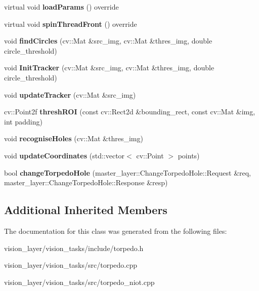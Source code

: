 \begin{DoxyCompactItemize}
\item 
\mbox{\label{classTorpedo_aa7080c7f22c85dc381eb83b547b619e5}} 
virtual void {\bfseries load\+Params} () override
\item 
\mbox{\label{classTorpedo_a0b9be299d42d31a8eda90f0322fc1325}} 
virtual void {\bfseries spin\+Thread\+Front} () override
\item 
\mbox{\label{classTorpedo_a034e99a1d14fd16b174f15d12c579075}} 
void {\bfseries find\+Circles} (cv\+::\+Mat \&src\+\_\+img, cv\+::\+Mat \&thres\+\_\+img, double circle\+\_\+threshold)
\item 
\mbox{\label{classTorpedo_a2010f06ca24b6ebfcd10b05346a889da}} 
void {\bfseries Init\+Tracker} (cv\+::\+Mat \&src\+\_\+img, cv\+::\+Mat \&thres\+\_\+img, double circle\+\_\+threshold)
\item 
\mbox{\label{classTorpedo_a7f0bdf8a23ae27e30177ce27fbd1488d}} 
void {\bfseries update\+Tracker} (cv\+::\+Mat \&src\+\_\+img)
\item 
\mbox{\label{classTorpedo_ad5e92180089075ecb42f3cea1bd79e4c}} 
cv\+::\+Point2f {\bfseries thresh\+R\+OI} (const cv\+::\+Rect2d \&bounding\+\_\+rect, const cv\+::\+Mat \&img, int padding)
\item 
\mbox{\label{classTorpedo_a12ba525a4852334b7216f497e2cc0582}} 
void {\bfseries recognise\+Holes} (cv\+::\+Mat \&thres\+\_\+img)
\item 
\mbox{\label{classTorpedo_a3b398b866dc7f1de82e88104bc02279a}} 
void {\bfseries update\+Coordinates} (std\+::vector$<$ cv\+::\+Point $>$ points)
\item 
\mbox{\label{classTorpedo_a1ba524abe3d67879957236006b7dd026}} 
bool {\bfseries change\+Torpedo\+Hole} (master\+\_\+layer\+::\+Change\+Torpedo\+Hole\+::\+Request \&req, master\+\_\+layer\+::\+Change\+Torpedo\+Hole\+::\+Response \&resp)
\end{DoxyCompactItemize}
\subsection*{Additional Inherited Members}


The documentation for this class was generated from the following files\+:\begin{DoxyCompactItemize}
\item 
vision\+\_\+layer/vision\+\_\+tasks/include/torpedo.\+h\item 
vision\+\_\+layer/vision\+\_\+tasks/src/torpedo.\+cpp\item 
vision\+\_\+layer/vision\+\_\+tasks/src/torpedo\+\_\+niot.\+cpp\end{DoxyCompactItemize}
